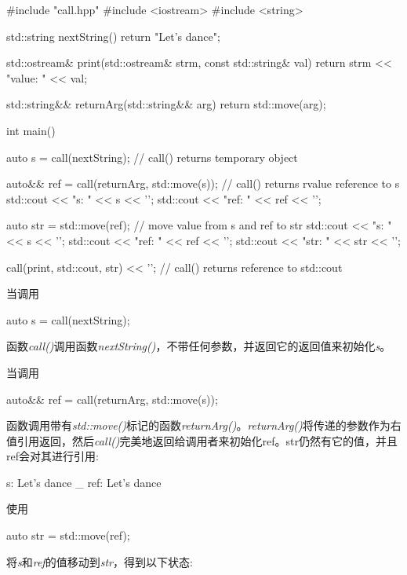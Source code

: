 \begin{cppcode}
#include "call.hpp"
#include <iostream>
#include <string>

std::string nextString()
{
	return "Let's dance";
}

std::ostream& print(std::ostream& strm, const std::string& val)
{
	return strm << "value: " << val;
}

std::string&& returnArg(std::string&& arg)
{
	return std::move(arg);
}

int main()
{
	auto s = call(nextString); // call() returns temporary object
	
	auto&& ref = call(returnArg, std::move(s)); // call() returns rvalue reference to s
	std::cout << "s: " << s << '\n';
	std::cout << "ref: " << ref << '\n';
	
	auto str = std::move(ref); // move value from s and ref to str
	std::cout << "s: " << s << '\n';
	std::cout << "ref: " << ref << '\n';
	std::cout << "str: " << str << '\n';
	
	call(print, std::cout, str) << '\n'; // call() returns reference to std::cout
}
\end{cppcode}

当调用

\begin{cppcode}
auto s = call(nextString);
\end{cppcode}

函数\textit{call()}调用函数\textit{nextString()}，不带任何参数，并返回它的返回值来初始化\textit{s}。

当调用

\begin{cppcode}
auto&& ref = call(returnArg, std::move(s));
\end{cppcode}

函数调用带有\textit{std::move()}标记的函数\textit{returnArg()}。\textit{returnArg()}将传递的参数作为右值引用返回，然后\textit{call()}完美地返回给调用者来初始化ref。str仍然有它的值，并且ref会对其进行引用:

\begin{shell}
s: Let's dance _
ref: Let's dance
\end{shell}

使用

\begin{cppcode}
auto str = std::move(ref);
\end{cppcode}

将\textit{s}和\textit{ref}的值移动到\textit{str}，得到以下状态:

